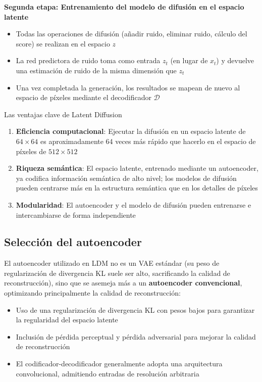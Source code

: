 \textbf{Segunda etapa: Entrenamiento del modelo de difusión en el espacio latente}
\begin{itemize}
    \item Todas las operaciones de difusión (añadir ruido, eliminar ruido, cálculo del score) se realizan en el espacio $z$
    \item La red predictora de ruido toma como entrada $z_t$ (en lugar de $x_t$) y devuelve una estimación de ruido de la misma dimensión que $z_t$
    \item Una vez completada la generación, los resultados se mapean de nuevo al espacio de píxeles mediante el decodificador $\mathcal{D}$
\end{itemize}

\begin{importantbox}{Las ventajas clave de Latent Diffusion}
\begin{enumerate}
    \item \textbf{Eficiencia computacional}: Ejecutar la difusión en un espacio latente de $64\times64$ es aproximadamente 64 veces más rápido que hacerlo en el espacio de píxeles de $512\times512$
    \item \textbf{Riqueza semántica}: El espacio latente, entrenado mediante un autoencoder, ya codifica información semántica de alto nivel; los modelos de difusión pueden centrarse más en la estructura semántica que en los detalles de píxeles
    \item \textbf{Modularidad}: El autoencoder y el modelo de difusión pueden entrenarse e intercambiarse de forma independiente
\end{enumerate}
\end{importantbox}

\subsection{Selección del autoencoder}

El autoencoder utilizado en LDM no es un VAE estándar (su peso de regularización de divergencia KL suele ser alto, sacrificando la calidad de reconstrucción), sino que se asemeja más a un \textbf{autoencoder convencional}, optimizando principalmente la calidad de reconstrucción:

\begin{itemize}
    \item Uso de una regularización de divergencia KL con pesos bajos para garantizar la regularidad del espacio latente
    \item Inclusión de pérdida perceptual y pérdida adversarial para mejorar la calidad de reconstrucción
    \item El codificador-decodificador generalmente adopta una arquitectura convolucional, admitiendo entradas de resolución arbitraria
\end{itemize}

